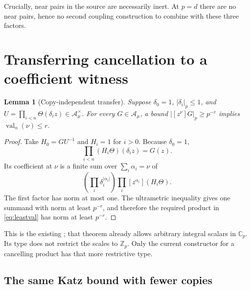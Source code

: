 \documentclass[11pt,letterpaper]{article}
\newtheorem{lemma}[theorem]{Lemma}
\theoremstyle{remark}\newtheorem{remark}[theorem]{Remark}
\newcommand{\Cp}{\mathbb C_p}
\newcommand{\Zp}{\mathbb Z_p}
\newcommand{\A}{\mathcal A}
\newcommand{\val}{\operatorname{val}}
\newcommand{\decl}[1]{\textnormal{\small\texttt{\detokenize{#1}}}}
\begin{document}
Crucially, near pairs in the source are necessarily inert. At $p=d$ there
are no near pairs, hence no second coupling construction to combine with
these three factors.\cite{nearpairs}

\section{Transferring cancellation to a coefficient witness}
\label{sec:transfer}

\begin{lemma}[Copy-independent transfer]\label{lem:transfer}
Suppose $\delta_0=1$, $|\delta_i|_p\leq1$, and
$U=\prod_{i<n}\Theta(\delta_i z)\in\A_\mu^\times$.
For every $G\in\A_\mu$, a bound
$|[z^\nu]G|_p\geq p^{-r}$ implies $\val_n(\nu)\leq r$.
\end{lemma}
\begin{proof}
Take $H_0=GU^{-1}$ and $H_i=1$ for $i>0$. Because $\delta_0=1$,
\[
 \prod_{i<n}(H_i\Theta)(\delta_i z)=G(z).
\]
Its coefficient at $\nu$ is a finite sum over $\sum_i\alpha_i=\nu$ of
\[
 \left(\prod_i\delta_i^{|\alpha_i|}\right)
 \prod_i[z^{\alpha_i}](H_i\Theta).
\]
The first factor has norm at most one. The ultrametric inequality gives
one summand with norm at least $p^{-r}$, and therefore the required product
in \eqref{eq:leastval} has norm at least $p^{-r}$.
\end{proof}

This is the existing \decl{leastValLE_of_rescale}; that theorem already
allows arbitrary integral scalars in $\Cp$. Its type does not restrict
the scales to $\Zp$. Only the current constructor for a cancelling product
has that more restrictive type.\cite{leastval}

\subsection{The same Katz bound with fewer copies}
\end{document}
